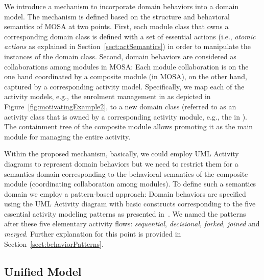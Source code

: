 We introduce a mechanism to incorporate domain behaviors into a domain model. The mechanism is defined based on the structure and behavioral semantics of MOSA at two points. %
%
First, each module class that owns a corresponding domain class  is defined with a set of essential actions (i.e., \textit{atomic actions} as explained in Section~\ref{sect:actSemantics}) in order to manipulate the instances of the domain class. %
%
Second, domain behaviors are considered as collaborations among modules in MOSA: Each module collaboration is on the one hand coordinated by a composite module (in MOSA), on the other hand, captured by a corresponding activity model. Specifically, we map each of the activity models, e.g., the enrolment management in \courseman as depicted in Figure~\ref{fig:motivatingExample2}, to a new domain class (referred to as an activity class that is owned by a corresponding activity module, e.g., the  in \courseman). The containment tree of the composite module allows promoting it as the main module for managing the entire activity.

Within the proposed mechanism, basically, we could employ UML Activity diagrams to represent domain behaviors but we need to restrict them for a semantics domain corresponding to the behavioral semantics of the composite module (coordinating collaboration among modules). To define such a semantics domain we employ a pattern-based approach: Domain behaviors are specified using the UML Activity diagram with basic constructs corresponding to the five essential activity modeling patterns as presented in~\cite{le_domain_2018}. We named the patterns after these five elementary activity flows: \textit{sequential}, \textit{decisional}, \textit{forked}, \textit{joined} and \textit{merged}. Further explanation for this point is provided in Section~\ref{sect:behaviorPatterns}.

\subsection{Unified Model}
\label{subsect:unifiedModel}

